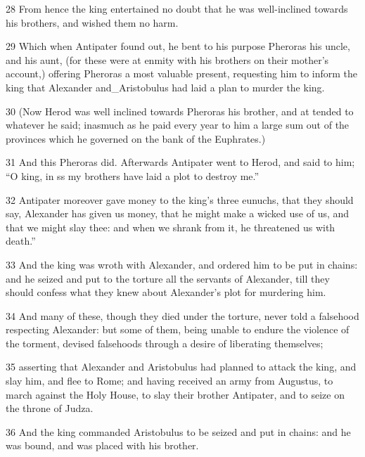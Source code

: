 \par 28 From hence the king entertained no doubt that he was well-inclined towards his brothers, and wished them no harm. 

\par 29 Which when Antipater found out, he bent to his purpose Pheroras his uncle, and his aunt, (for these were at enmity with his brothers on their mother’s account,) offering Pheroras a most valuable present, requesting him to inform the king that Alexander and_Aristobulus had laid a plan to murder the king. 

\par 30 (Now Herod was well inclined towards Pheroras his brother, and at tended to whatever he said; inasmuch as he paid every year to him a large sum out of the provinces which he governed on the bank of the Euphrates.) 

\par 31 And this Pheroras did. Afterwards Antipater went to Herod, and said to him; “O king, in ss my brothers have laid a plot to destroy me.” 

\par 32 Antipater moreover gave money to the king's three eunuchs, that they should say, Alexander has given us money, that he might make a wicked use of us, and that we might slay thee: and when we shrank from it, he threatened us with death.” 

\par 33 And the king was wroth with Alexander, and ordered him to be put in chains: and he seized and put to the torture all the servants of Alexander, till they should confess what they knew about Alexander’s plot for murdering him. 

\par 34 And many of these, though they died under the torture, never told a falsehood respecting Alexander: but some of them, being unable to endure the violence of the torment, devised falsehoods through a desire of liberating themselves; 

\par 35 asserting that Alexander and Aristobulus had planned to attack the king, and slay him, and flee to Rome; and having received an army from Augustus, to march against the Holy House, to slay their brother Antipater, and to seize on the throne of Judza. 

\par 36 And the king commanded Aristobulus to be seized and put in chains: and he was bound, and was placed with his brother. 

